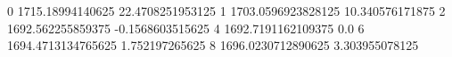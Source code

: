0 1715.18994140625 22.4708251953125
1 1703.0596923828125 10.340576171875
2 1692.562255859375 -0.1568603515625
4 1692.7191162109375 0.0
6 1694.4713134765625 1.752197265625
8 1696.0230712890625 3.303955078125
